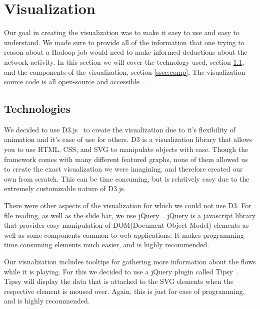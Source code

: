 \section{Visualization}
\label{sec:viz}
Our goal in creating the visualization was to make it easy to use and
easy to understand. We made sure to provide all of the information
that one trying to reason about a Hadoop job would need to make
informed deductions about the network activity. In this section we
will cover the technology used, section \ref{ssec:tech}, and the components of the
visualization, section \ref{ssec:comp}. The visualization source code is all open-source
and accessible~\cite{HadoopVizExample, HadoopVizCode}.

\subsection{Technologies}
\label{ssec:tech}
We decided to use D3.js~\cite{D3.js} to create the visualization due to
it's flexibility of animation and it's ease of use for others. D3 is a
visualization library that allows you to use HTML, CSS, and SVG to
manipulate objects with ease. Though the framework comes with many
different featured graphs, none of them allowed us to create the exact
visualization we were imagining, and therefore created our own from
scratch. This can be time consuming, but is relatively easy due to the
extremely customizable nature of D3.js.

There were other aspects of the visualization for which we could not
use D3. For file reading, as well as the slide bar, we use
jQuery~\cite{jQuery}. jQuery is a javascript library that provides
easy manipulation of DOM(Document Object Model) elements as well as
some components common to web applications. It makes programming time
consuming elements much easier, and is highly recommended.

Our visualization includes tooltips for gathering more information
about the flows while it is playing. For this we decided to use a
jQuery plugin called Tipsy~\cite{tipsy}. Tipsy will display the data
that is attached to the SVG elements when the respective element is
moused over. Again, this is just for ease of programming, and is
highly recommended.

